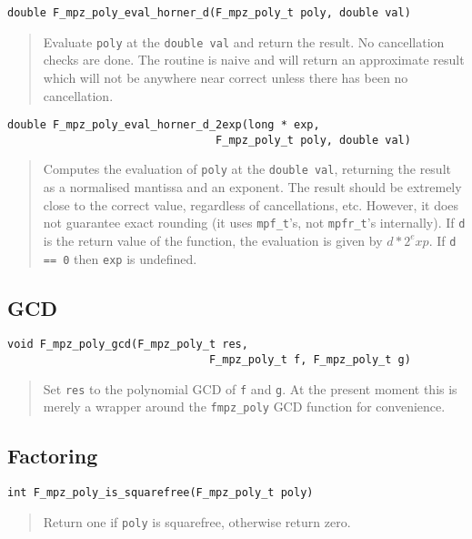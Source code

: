 \documentclass[a4paper,10pt]{article}
\newcommand{\code}{\lstinline}
\begin{document}
\begin{lstlisting}
double F_mpz_poly_eval_horner_d(F_mpz_poly_t poly, double val)
\end{lstlisting}
\begin{quote}
Evaluate \code{poly} at the \code{double val} and return the result. No cancellation checks are done. 
The routine is naive and will return an approximate result which will not be anywhere near correct 
unless there has been no cancellation.
\end{quote}

\begin{lstlisting}
double F_mpz_poly_eval_horner_d_2exp(long * exp, 
                                F_mpz_poly_t poly, double val)
\end{lstlisting}
\begin{quote}
Computes the evaluation of \code{poly} at the \code{double val}, returning the result as a normalised 
mantissa and an exponent. The result should be extremely close to the correct value, regardless of 
cancellations, etc. However, it does not guarantee exact rounding (it uses \code{mpf_t}'s, not 
\code{mpfr_t}'s internally). If \code{d} is the return value of the function, the evaluation is given 
by $d*2^exp$. If \code{d == 0} then \code{exp} is undefined.
\end{quote}

\subsection{GCD}

\begin{lstlisting}
void F_mpz_poly_gcd(F_mpz_poly_t res, 
                               F_mpz_poly_t f, F_mpz_poly_t g)
\end{lstlisting}
\begin{quote}
Set \code{res} to the polynomial GCD of \code{f} and \code{g}. At the present moment this is merely
a wrapper around the \code{fmpz_poly} GCD function for convenience.
\end{quote}

\subsection{Factoring}

\begin{lstlisting}
int F_mpz_poly_is_squarefree(F_mpz_poly_t poly)
\end{lstlisting}
\begin{quote}
Return one if \code{poly} is squarefree, otherwise return zero.
\end{quote}
\end{document}
